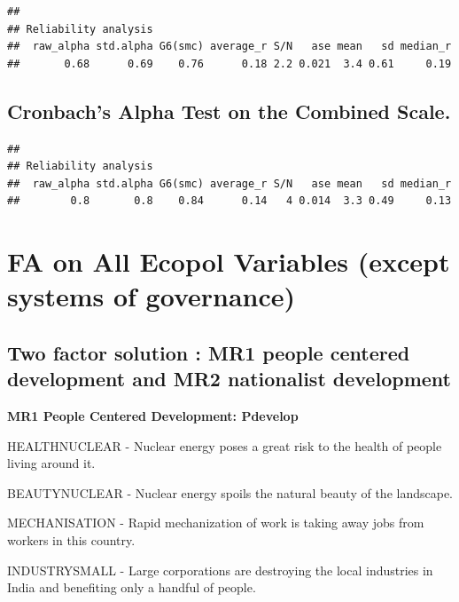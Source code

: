 \documentclass[
]{article}
\begin{document}
\begin{verbatim}
## 
## Reliability analysis   
##  raw_alpha std.alpha G6(smc) average_r S/N   ase mean   sd median_r
##       0.68      0.69    0.76      0.18 2.2 0.021  3.4 0.61     0.19
\end{verbatim}

\hypertarget{cronbachs-alpha-test-on-the-combined-scale.}{%
\subsection{Cronbach's Alpha Test on the Combined
Scale.}\label{cronbachs-alpha-test-on-the-combined-scale.}}

\begin{verbatim}
## 
## Reliability analysis   
##  raw_alpha std.alpha G6(smc) average_r S/N   ase mean   sd median_r
##        0.8       0.8    0.84      0.14   4 0.014  3.3 0.49     0.13
\end{verbatim}

\newpage

\hypertarget{fa-on-all-ecopol-variables-except-systems-of-governance}{%
\section{FA on All Ecopol Variables (except systems of
governance)}\label{fa-on-all-ecopol-variables-except-systems-of-governance}}

\hypertarget{two-factor-solution-mr1-people-centered-development-and-mr2-nationalist-development}{%
\subsection{Two factor solution : MR1 people centered development and
MR2 nationalist
development}\label{two-factor-solution-mr1-people-centered-development-and-mr2-nationalist-development}}

\textbf{MR1 People Centered Development: Pdevelop}

HEALTHNUCLEAR - Nuclear energy poses a great risk to the health of
people living around it.

BEAUTYNUCLEAR - Nuclear energy spoils the natural beauty of the
landscape.

MECHANISATION - Rapid mechanization of work is taking away jobs from
workers in this country.

INDUSTRYSMALL - Large corporations are destroying the local industries
in India and benefiting only a handful of people.
\end{document}
